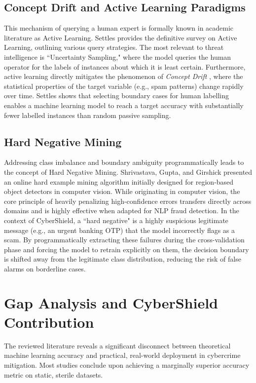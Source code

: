 \subsection{Concept Drift and Active Learning Paradigms}
This mechanism of querying a human expert is formally known in academic literature as Active Learning. Settles \cite{settles2009active} provides the definitive survey on Active Learning, outlining various query strategies. The most relevant to threat intelligence is ``Uncertainty Sampling," where the model queries the human operator for the labels of instances about which it is least certain. Furthermore, active learning directly mitigates the phenomenon of \textit{Concept Drift} \cite{gama2014survey}, where the statistical properties of the target variable (e.g., spam patterns) change rapidly over time. Settles shows that selecting boundary cases for human labelling enables a machine learning model to reach a target accuracy with substantially fewer labelled instances than random passive sampling.

\subsection{Hard Negative Mining}
Addressing class imbalance and boundary ambiguity programmatically leads to the concept of Hard Negative Mining. Shrivastava, Gupta, and Girshick \cite{shrivastava2016training} presented an online hard example mining algorithm initially designed for region-based object detectors in computer vision. While originating in computer vision, the core principle of heavily penalizing high-confidence errors transfers directly across domains and is highly effective when adapted for NLP fraud detection. In the context of CyberShield, a ``hard negative" is a highly suspicious legitimate message (e.g., an urgent banking OTP) that the model incorrectly flags as a scam. By programmatically extracting these failures during the cross-validation phase and forcing the model to retrain explicitly on them, the decision boundary is shifted away from the legitimate class distribution, reducing the risk of false alarms on borderline cases.

\section{Gap Analysis and CyberShield Contribution}
The reviewed literature reveals a significant disconnect between theoretical machine learning accuracy and practical, real-world deployment in cybercrime mitigation. Most studies conclude upon achieving a marginally superior accuracy metric on static, sterile datasets. 

